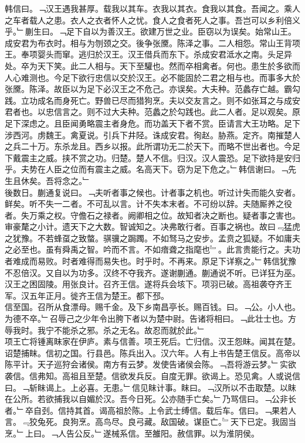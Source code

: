 \documentclass{zhvt-classic}
\begin{document}
\hspace*{2em}韩信曰。﹁汉王遇我甚厚。载我以其车。衣我以其衣。食我以其食。吾闻之。乘人之车者载人之患。衣人之衣者怀人之忧。食人之食者死人之事。吾岂可以乡利倍义乎。﹂蒯生曰。﹁足下自以为善汉王。欲建万世之业。臣窃以为误矣。始常山王。成安君为布衣时。相与为刎颈之交。後争张黡。陈泽之事。二人相怨。常山王背项王。奉项婴头而窜。逃归於汉王。汉王借兵而东下。杀成安君泜水之南。头足异处。卒为天下笑。此二人相与。天下至驩也。然而卒相禽者。何也。患生於多欲而人心难测也。今足下欲行忠信以交於汉王。必不能固於二君之相与也。而事多大於张黡。陈泽。故臣以为足下必汉王之不危己。亦误矣。大夫种。范蠡存亡越。霸勾践。立功成名而身死亡。野兽已尽而猎狗烹。夫以交友言之。则不如张耳之与成安君者也。以忠信言之。则不过大夫种。范蠡之於勾践也。此二人者。足以观矣。原足下深虑之。且臣闻勇略震主者身危。而功盖天下者不赏。臣请言大王功略。足下涉西河。虏魏王。禽夏说。引兵下井陉。诛成安君。徇赵。胁燕。定齐。南摧楚人之兵二十万。东杀龙且。西乡以报。此所谓功无二於天下。而略不世出者也。今足下戴震主之威。挟不赏之功。归楚。楚人不信。归汉。汉人震恐。足下欲持是安归乎。夫势在人臣之位而有震主之威。名高天下。窃为足下危之。﹂韩信谢曰。﹁先生且休矣。吾将念之。﹂\\
\hspace*{2em}後数日。蒯通复说曰。﹁夫听者事之候也。计者事之机也。听过计失而能久安者。鲜矣。听不失一二者。不可乱以言。计不失本末者。不可纷以辞。夫随厮养之役者。失万乘之权。守儋石之禄者。阙卿相之位。故知者决之断也。疑者事之害也。审豪氂之小计。遗天下之大数。智诚知之。决弗敢行者。百事之祸也。故曰﹃猛虎之犹豫。不若蜂虿之致螫。骐骥之跼躅。不如驽马之安步。孟贲之狐疑。不如庸夫之必至也。虽有舜禹之智。吟而不言。不如瘖聋之指麾也﹄。此言贵能行之。夫功者难成而易败。时者难得而易失也。时乎时。不再来。原足下详察之。﹂韩信犹豫不忍倍汉。又自以为功多。汉终不夺我齐。遂谢蒯通。蒯通说不听。已详狂为巫。\\
\hspace*{2em}汉王之困固陵。用张良计。召齐王信。遂将兵会垓下。项羽已破。高祖袭夺齐王军。汉五年正月。徙齐王信为楚王。都下邳。\\
\hspace*{2em}信至国。召所从食漂母。赐千金。及下乡南昌亭长。赐百钱。曰。﹁公。小人也。为德不卒。﹂召辱己之少年令出胯下者以为楚中尉。告诸将相曰。﹁此壮士也。方辱我时。我宁不能杀之邪。杀之无名。故忍而就於此。﹂\\
\hspace*{2em}项王亡将锺离眜家在伊庐。素与信善。项王死后。亡归信。汉王怨眜。闻其在楚。诏楚捕眜。信初之国。行县邑。陈兵出入。汉六年。人有上书告楚王信反。高帝以陈平计。天子巡狩会诸侯。南方有云梦。发使告诸侯会陈。﹁吾将游云梦。﹂实欲袭信。信弗知。高祖且至楚。信欲发兵反。自度无罪。欲谒上。恐见禽。人或说信曰。﹁斩眜谒上。上必喜。无患。﹂信见眜计事。眜曰。﹁汉所以不击取楚。以眜在公所。若欲捕我以自媚於汉。吾今日死。公亦随手亡矣。﹂乃骂信曰。﹁公非长者。﹂卒自刭。信持其首。谒高祖於陈。上令武士缚信。载后车。信曰。﹁果若人言。﹃狡兔死。良狗烹。高鸟尽。良弓藏。敌国破。谋臣亡。﹄天下已定。我固当烹。﹂上曰。﹁人告公反。﹂遂械系信。至雒阳。赦信罪。以为淮阴侯。\\
\end{document}
